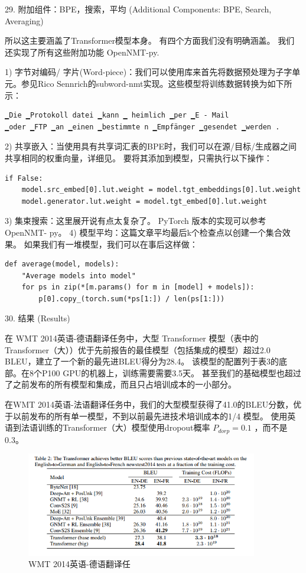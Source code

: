29. 附加组件：BPE，搜索，平均 (Additional Components: BPE, Search, Averaging)

所以这主要涵盖了Transformer模型本身。 有四个方面我们没有明确涵盖。 我们还实现了所有这些附加功能 OpenNMT-py.

1) 字节对编码/ 字片(Word-piece)：我们可以使用库来首先将数据预处理为子字单元。参见Rico Sennrich的subword-nmt实现。这些模型将训练数据转换为如下所示：

\begin{Verbatim}
▁Die ▁Protokoll datei ▁kann ▁ heimlich ▁per ▁E - Mail 
▁oder ▁FTP ▁an ▁einen ▁bestimmte n ▁Empfänger ▁gesendet ▁werden .
\end{Verbatim}

2) 共享嵌入：当使用具有共享词汇表的BPE时，我们可以在源/目标/生成器之间共享相同的权重向量，详细见。 要将其添加到模型，只需执行以下操作：

\begin{Verbatim}
if False:
    model.src_embed[0].lut.weight = model.tgt_embeddings[0].lut.weight
    model.generator.lut.weight = model.tgt_embed[0].lut.weight
\end{Verbatim}

3) 集束搜索：这里展开说有点太复杂了。 PyTorch 版本的实现可以参考 OpenNMT- py。
4) 模型平均：这篇文章平均最后k个检查点以创建一个集合效果。 如果我们有一堆模型，我们可以在事后这样做：

\begin{Verbatim}
def average(model, models):
    "Average models into model"
    for ps in zip(*[m.params() for m in [model] + models]):
        p[0].copy_(torch.sum(*ps[1:]) / len(ps[1:]))
\end{Verbatim}

30. 结果 (Results)

在 WMT 2014英语-德语翻译任务中，大型 Transformer 模型（表中的Transformer（大））优于先前报告的最佳模型（包括集成的模型）超过2.0 BLEU，建立了一个新的最先进BLEU得分为28.4。 该模型的配置列于表3的底部。在8个P100 GPU的机器上，训练需要需要3.5天。 甚至我们的基础模型也超过了之前发布的所有模型和集成，而且只占培训成本的一小部分。

在WMT 2014英语-法语翻译任务中，我们的大型模型获得了41.0的BLEU分数，优于以前发布的所有单一模型，不到以前最先进技术培训成本的1/4 模型。 使用英语到法语训练的Transformer（大）模型使用dropout概率 $P_{dorp}=0.1$ ，而不是0.3。

\begin{figure}[htb]
\centering 
\includegraphics[width=0.9\textwidth]{img/n9.png} 
\caption{WMT 2014英语-德语翻译任}
\label{Test}
\end{figure}

